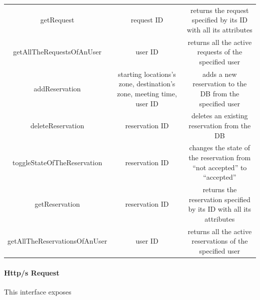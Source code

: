 \documentclass{article}
\begin{document}
\begin{itemize}
\begin{tabular}{*{3}{c}}
			getRequest & request ID & returns the request specified by its ID with all its attributes \\
			getAllTheRequestsOfAnUser & user ID & returns all the active requests of the specified user \\
			addReservation & starting locations's zone, destination's zone, meeting time, user ID & adds a new reservation to the DB from the specified user\\
			deleteReservation & reservation ID & deletes an existing reservation from the DB\\
			toggleStateOfTheReservation & reservation ID & changes the state of the reservation from ``not accepted'' to ``accepted''\\
			getReservation & reservation ID & returns the reservation specified by its ID with all its attributes\\
			getAllTheReservationsOfAnUser & user ID & returns all the active reservations of the specified user \\ 
			\bottomrule
		\end{tabular}	
\end{itemize}
\paragraph{Http/s Request}
This interface exposes  %
\end{document}
